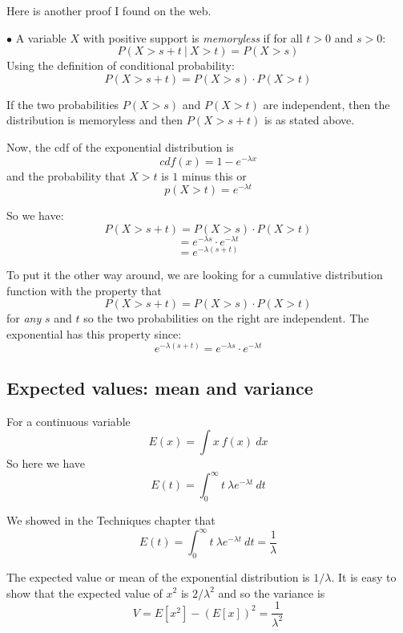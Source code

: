 \documentclass[11pt, oneside]{article}
\begin{document}
Here is another proof I found on the web.

$\bullet$ A variable $X$ with positive support is \emph{memoryless} if for all $t > 0$ and $s > 0$:
\[ P(X > s+t \ | \ X > t) = P(X > s) \]
Using the definition of conditional probability:
\[ P(X > s+t) = P(X > s) \cdot P(X > t) \]

If the two probabilities $P(X > s)$ and $P(X > t)$ are independent, then the distribution is memoryless and then $P(X > s + t)$ is as stated above.

Now, the cdf of the exponential distribution is
\[ cdf(x) = 1 - e^{-\lambda x} \]
and the probability that $X > t$ is $1$ minus this or
\[ p(X > t) = e^{-\lambda t} \]

So we have:
\[ P(X > s+t) = P(X > s) \cdot P(X > t) \]
\[ = e^{-\lambda s} \cdot e^{-\lambda t} \]
\[ = e^{-\lambda (s+t)} \]

To put it the other way around, we are looking for a cumulative distribution function with the property that 
\[ P(X > s+t) = P(X > s) \cdot P(X > t) \]
for \emph{any} $s$ and $t$ so the two probabilities on the right are independent.  The exponential has this property since:
\[ e^{-\lambda (s+t)} = e^{-\lambda s} \cdot e^{-\lambda t} \]

\subsection*{Expected values:  mean and variance}
For a continuous variable
\[ E(x) = \int x \ f(x) \ dx \]
So here we have
\[ E(t) = \int_0^{\infty} t \ \lambda e^{-\lambda t} \ dt \]

We showed in the Techniques chapter that
\[ E(t) = \int_0^{\infty} t \ \lambda e^{-\lambda t} \ dt = \frac{1}{\lambda} \]

The expected value or mean of the exponential distribution is $1/\lambda$.  It is easy to show that the expected value of $x^2$ is $2/\lambda^2$ and so the variance is
\[ V = E[x^2] - (E[x])^2 = \frac{1}{\lambda^2} \]
\end{document}
